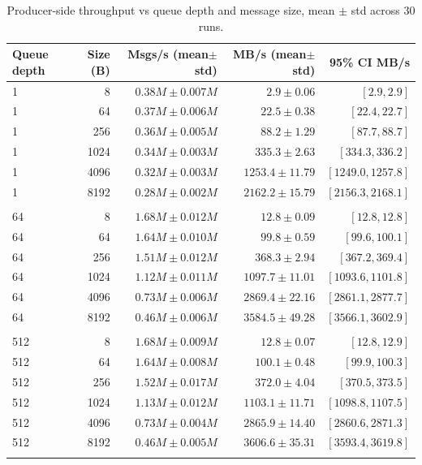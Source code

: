 \begin{table}[!t]
\centering
\caption{Producer-side throughput vs queue depth and message size, mean $\pm$ std across 30 runs.}
\label{tab:throughput}
\begin{tabular}{lrrrr}
\toprule
\textbf{Queue depth} & \textbf{Size (B)} & \textbf{Msgs/s (mean$\pm$std)} & \textbf{MB/s (mean$\pm$std)} & \textbf{95\% CI MB/s} \\
\midrule
1 & 8 & $0.38M \pm 0.007M$ & $2.9 \pm 0.06$ & $[2.9, 2.9]$ \\
1 & 64 & $0.37M \pm 0.006M$ & $22.5 \pm 0.38$ & $[22.4, 22.7]$ \\
1 & 256 & $0.36M \pm 0.005M$ & $88.2 \pm 1.29$ & $[87.7, 88.7]$ \\
1 & 1024 & $0.34M \pm 0.003M$ & $335.3 \pm 2.63$ & $[334.3, 336.2]$ \\
1 & 4096 & $0.32M \pm 0.003M$ & $1253.4 \pm 11.79$ & $[1249.0, 1257.8]$ \\
1 & 8192 & $0.28M \pm 0.002M$ & $2162.2 \pm 15.79$ & $[2156.3, 2168.1]$ \\
 &  &  &  &  \\
64 & 8 & $1.68M \pm 0.012M$ & $12.8 \pm 0.09$ & $[12.8, 12.8]$ \\
64 & 64 & $1.64M \pm 0.010M$ & $99.8 \pm 0.59$ & $[99.6, 100.1]$ \\
64 & 256 & $1.51M \pm 0.012M$ & $368.3 \pm 2.94$ & $[367.2, 369.4]$ \\
64 & 1024 & $1.12M \pm 0.011M$ & $1097.7 \pm 11.01$ & $[1093.6, 1101.8]$ \\
64 & 4096 & $0.73M \pm 0.006M$ & $2869.4 \pm 22.16$ & $[2861.1, 2877.7]$ \\
64 & 8192 & $0.46M \pm 0.006M$ & $3584.5 \pm 49.28$ & $[3566.1, 3602.9]$ \\
 &  &  &  &  \\
512 & 8 & $1.68M \pm 0.009M$ & $12.8 \pm 0.07$ & $[12.8, 12.9]$ \\
512 & 64 & $1.64M \pm 0.008M$ & $100.1 \pm 0.48$ & $[99.9, 100.3]$ \\
512 & 256 & $1.52M \pm 0.017M$ & $372.0 \pm 4.04$ & $[370.5, 373.5]$ \\
512 & 1024 & $1.13M \pm 0.012M$ & $1103.1 \pm 11.71$ & $[1098.8, 1107.5]$ \\
512 & 4096 & $0.73M \pm 0.004M$ & $2865.9 \pm 14.40$ & $[2860.6, 2871.3]$ \\
512 & 8192 & $0.46M \pm 0.005M$ & $3606.6 \pm 35.31$ & $[3593.4, 3619.8]$ \\
 &  &  &  &  \\
\bottomrule
\end{tabular}
\end{table}
